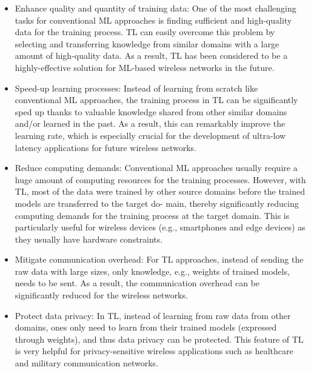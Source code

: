 \documentclass[letterpaper%
, twoside%
, 12pt%
,thesepararticles%
, english%
,creativecommons,hyperref, withAlgo2e%
]{thETS}
\begin{document}
\begin{introduction}
\begin{itemize}
	\item Enhance quality and quantity of training data: One of the most challenging tasks for conventional ML approaches is finding sufficient and high-quality data for the training process. TL can easily overcome this problem by selecting and transferring knowledge from similar domains with a large amount of high-quality data. As a result, TL has been considered to be a highly-effective solution for ML-based wireless networks in the future.
	\item Speed-up learning processes: Instead of learning from scratch like conventional ML approaches, the training process in TL can be significantly sped up thanks to valuable knowledge shared from other similar domains and/or learned in the past. As a result, this can remarkably improve the learning rate, which is especially crucial for the development of ultra-low latency applications for future wireless networks.
	\item Reduce computing demands: Conventional ML approaches usually require a huge amount of computing resources for the training processes. However, with TL, most of the data were trained by other source domains before the trained models are transferred to the target do- main, thereby significantly reducing computing demands for the training process at the target domain. This is particularly useful for wireless devices (e.g., smartphones and edge devices) as they usually have hardware constraints.
	\item Mitigate communication overhead: For TL approaches, instead of sending the raw data with large sizes, only knowledge, e.g., weights of trained models, needs to be sent. As a result, the communication overhead can be significantly reduced for the wireless networks.
	\item{Protect data privacy: In TL, instead of learning from raw data from other domains, ones only need to learn from their trained models (expressed through weights), and thus data privacy can be protected. This feature of TL is very helpful for privacy-sensitive wireless applications such as healthcare and military communication networks.}
\end{itemize}

\end{introduction}

\end{document}
